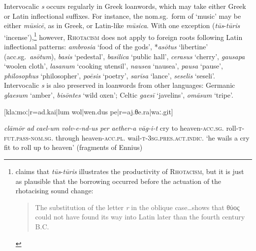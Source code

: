 Intervocalic \emph{s} occurs regularly in Greek loanwords, which may take either Greek or Latin inflectional suffixes.
For instance, the nom.sg.~form of `music' may be either \emph{mūsicē}, as in Greek, or Latin-like \emph{mūsica}.
With one exception (\emph{tūs}-\emph{tūris} `incense'),\footnote{
    \citeauthor{KiparskyInPress} claims that \emph{tūs}-\emph{tūris} illustrates the productivity of \textsc{Rhotacism}, but it is just as plausible that the borrowing occurred before the actuation of the rhotacising sound change:

\begin{quote}
The substitution of the letter \emph{r} in the oblique case\ldots{}shows
that θύος could not have found its way into Latin later than the fourth
century B.C. \cite[507]{Thiselton-Dyer1911}
\end{quote}}
however, \textsc{Rhotacism} does not apply to foreign roots following Latin inflectional patterns: \emph{ambrosia} `food of the gods', *\emph{asōtus} `libertine' (acc.sg.~\emph{asōtum}), \emph{basis} `pedestal', \emph{basilica} `public hall', \emph{cerasus} `cherry', \emph{gausapa} `woolen cloth', \emph{lasanum} `cooking utensil', \emph{nausea} `nausea', \emph{pausa} `pause', \emph{philosophus} `philosopher', \emph{poēsis} `poetry', \emph{sarīsa} `lance', \emph{seselis} `seseli'.
Intervocalic \emph{s} is also preserved in loanwords from other languages: Germanic \emph{glaesum} `amber', \emph{bisōntes} `wild oxen'; Celtic \emph{gaesī} `javelins', \emph{omāsum} `tripe'.


\begin{example}
\vspace{\baselineskip}
[klaːmoː|r=ad.kai|lum wol|wen.dus pe|r=aj.θe.ra|waː.git]

\gll \emph{clāmōr} \emph{ad} \emph{cael-um}          \emph{volv-e-nd-us}                                \emph{per} \emph{aether-a} \emph{vāg-i-t}
     cry         to        heaven-\textsc{acc.sg.} roll-\textsc{t}-\textsc{fut.pass}-\textsc{nom.sg.} through heaven-\textsc{acc.pl.} wail-\textsc{t}-\textsc{3sg.pres.act.indic.}
\glt `he wails a cry fit to roll up to heaven' (fragments of Ennius)
\glend

\end{example}
